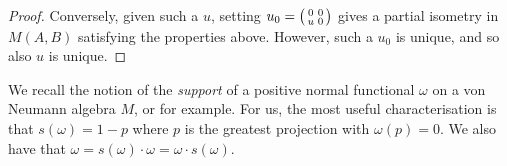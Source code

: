 \documentclass[a4paper,11pt]{article}
\theoremstyle{plain}
\theoremstyle{remark}
\newenvironment{smat}{\bigl(\begin{smallmatrix}}{\end{smallmatrix}\bigr)}
\begin{document}
\begin{proof}
Conversely, given such a $u$,  setting $u_0 = \begin{smat} 0 & 0 \\ u & 0 \end{smat}$ gives a partial isometry in $M(A,B)$ satisfying the properties above.  However, such a $u_0$ is unique, and so also $u$ is unique.
\end{proof}

We recall the notion of the \emph{support} of a positive normal functional $\omega$ on a von Neumann algebra $M$, \cite[Section~III.4]{TakesakiI} or \cite[Section~1.14]{Sakai_Book} for example.  For us, the most useful characterisation is that $s(\omega) = 1 - p$ where $p$ is the greatest projection with $\omega(p) = 0$. We also have that $\omega = s(\omega)\cdot\omega = \omega\cdot s(\omega)$.
\end{document}
